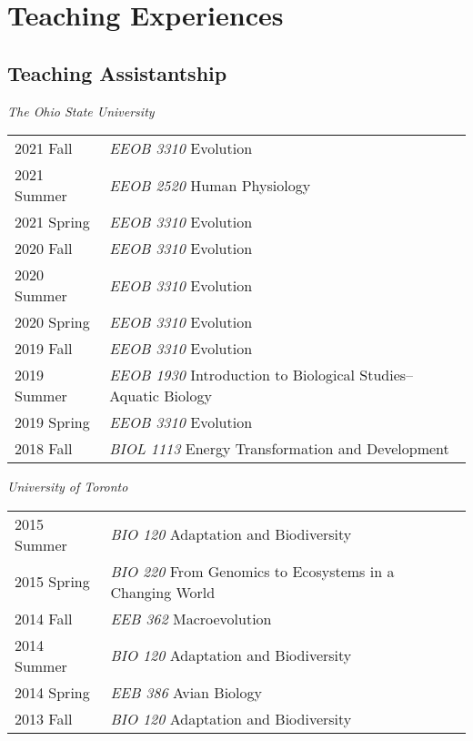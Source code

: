 \documentclass[11pt]{article}
\begin{document}
\hspace{0pt}



\section*{Teaching Experiences}

\subsection*{Teaching Assistantship}

\textit{The Ohio State University}\\
\begin{longtable}{p{}  p{}}

2021 Fall & \textit{EEOB 3310} Evolution\\
2021 Summer & \textit{EEOB 2520} Human Physiology\\
2021 Spring & \textit{EEOB 3310} Evolution\\
2020 Fall & \textit{EEOB 3310} Evolution\\
2020 Summer & \textit{EEOB 3310} Evolution\\
2020 Spring & \textit{EEOB 3310} Evolution\\
2019 Fall & \textit{EEOB 3310} Evolution\\
2019 Summer & \textit{EEOB 1930} Introduction to Biological Studies--Aquatic Biology\\
2019 Spring & \textit{EEOB 3310} Evolution\\
2018 Fall & \textit{BIOL 1113} Energy Transformation and Development\\
\end{longtable}


\textit{University of Toronto}\\
\begin{longtable}{p{}  p{}}

2015 Summer  & \textit{BIO 120} Adaptation and Biodiversity\\
2015 Spring & \textit{BIO 220} From Genomics to Ecosystems in a Changing World\\
2014 Fall & \textit{EEB 362} Macroevolution\\
2014 Summer & \textit{BIO 120} Adaptation and Biodiversity\\
2014 Spring & \textit{EEB 386} Avian Biology\\
2013 Fall & \textit{BIO 120} Adaptation and Biodiversity\\

\end{longtable}
\end{document}
